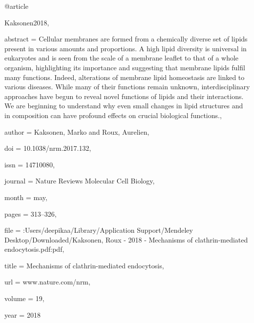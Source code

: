 @article{Kaksonen2018,

abstract = {Cellular membranes are formed from a chemically diverse set of lipids present in various amounts and proportions. A high lipid diversity is universal in eukaryotes and is seen from the scale of a membrane leaflet to that of a whole organism, highlighting its importance and suggesting that membrane lipids fulfil many functions. Indeed, alterations of membrane lipid homeostasis are linked to various diseases. While many of their functions remain unknown, interdisciplinary approaches have begun to reveal novel functions of lipids and their interactions. We are beginning to understand why even small changes in lipid structures and in composition can have profound effects on crucial biological functions.},

author = {Kaksonen, Marko and Roux, Aurelien},

doi = {10.1038/nrm.2017.132},

issn = {14710080},

journal = {Nature Reviews Molecular Cell Biology},

month = {may},

pages = {313--326},

file = {:Users/deepikaa/Library/Application Support/Mendeley Desktop/Downloaded/Kaksonen, Roux - 2018 - Mechanisms of clathrin-mediated endocytosis.pdf:pdf},

title = {{Mechanisms of clathrin-mediated endocytosis}},

url = {www.nature.com/nrm},

volume = {19},

year = {2018}

}

